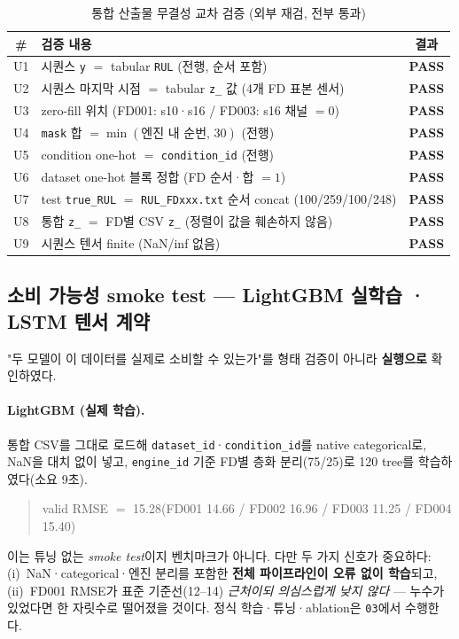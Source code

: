 \documentclass[11pt]{article}
\newcommand{\pass}{\textcolor{green!55!black}{\textbf{PASS}}}
\begin{document}
\begin{table}[H]
\centering
\caption{통합 산출물 무결성 교차 검증 (외부 재검, 전부 통과)}
\label{tab:ucheck}
\begin{tabular}{clc}
\toprule
\# & 검증 내용 & 결과 \\
\midrule
U1 & 시퀀스 \texttt{y} $=$ tabular \texttt{RUL} (전행, 순서 포함) & \pass \\
U2 & 시퀀스 마지막 시점 $=$ tabular \texttt{z\_} 값 (4개 FD 표본 센서) & \pass \\
U3 & zero-fill 위치 (FD001: s10·s16 / FD003: s16 채널 $=0$) & \pass \\
U4 & \texttt{mask} 합 $=\min(\text{엔진 내 순번},\,30)$ (전행) & \pass \\
U5 & condition one-hot $=$ \texttt{condition\_id} (전행) & \pass \\
U6 & dataset one-hot 블록 정합 (FD 순서·합 $=1$) & \pass \\
U7 & test \texttt{true\_RUL} $=$ \texttt{RUL\_FDxxx.txt} 순서 concat (100/259/100/248) & \pass \\
U8 & 통합 \texttt{z\_} $=$ FD별 CSV \texttt{z\_} (정렬이 값을 훼손하지 않음) & \pass \\
U9 & 시퀀스 텐서 finite (NaN/inf 없음) & \pass \\
\bottomrule
\end{tabular}
\end{table}

\subsection{소비 가능성 smoke test — LightGBM 실학습 · LSTM 텐서 계약}

"두 모델이 이 데이터를 실제로 소비할 수 있는가"를 형태 검증이 아니라 \textbf{실행으로} 확인하였다.

\paragraph{LightGBM (실제 학습).}
통합 CSV를 그대로 로드해 \texttt{dataset\_id}·\texttt{condition\_id}를 native categorical로, NaN을 대치 없이 넣고,
\texttt{engine\_id} 기준 FD별 층화 분리(75/25)로 120 tree를 학습하였다(소요 9초).

\begin{quote}\ttfamily
valid RMSE $=$ 15.28\quad (FD001 14.66 / FD002 16.96 / FD003 11.25 / FD004 15.40)
\end{quote}

이는 튜닝 없는 \emph{smoke test}이지 벤치마크가 아니다.
다만 두 가지 신호가 중요하다:
(i)~NaN·categorical·엔진 분리를 포함한 \textbf{전체 파이프라인이 오류 없이 학습}되고,
(ii)~FD001 RMSE가 표준 기준선(12--14) \emph{근처이되 의심스럽게 낮지 않다} — 누수가 있었다면 한 자릿수로 떨어졌을 것이다.
정식 학습·튜닝·ablation은 \texttt{03}에서 수행한다.
\end{document}
